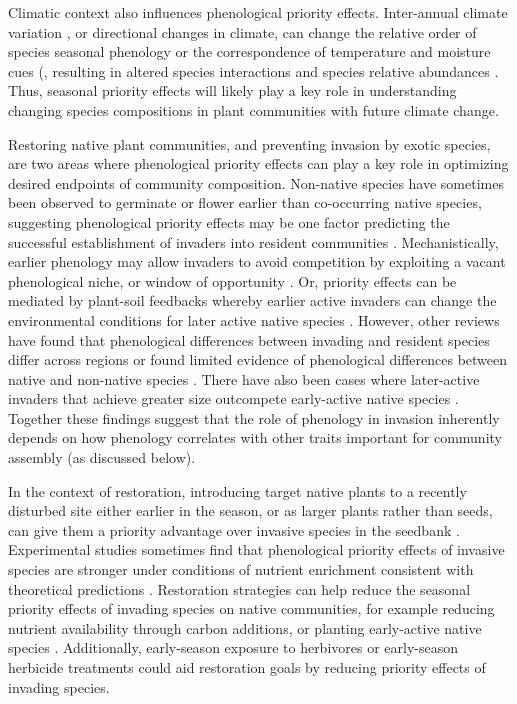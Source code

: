 \documentclass[11pt]{article}
\begin{document}
Climatic context also influences phenological priority effects. Inter-annual climate variation \citep{levine2011seasonal}, or directional changes in climate, can change the relative order of species seasonal phenology or the correspondence of temperature and moisture cues (\cite{kimball2010contemporary}, resulting in altered species interactions and species relative abundances \citep{thomson2017between,kimball2010contemporary,buonaiuto2023contrasting}. Thus, seasonal priority effects will likely play a key role in understanding changing species compositions in plant communities with future climate change.

Restoring native plant communities, and preventing invasion by exotic species, are two areas where phenological priority effects can play a key role in optimizing desired endpoints of community composition. Non-native species have sometimes been observed to germinate \citep{wainwright2012seasonal,wilsey2011biodiversity,marushia2010phenology} or flower \citep{cleland2013strengthening} earlier than co-occurring native species, suggesting phenological priority effects may be one factor predicting the successful establishment of invaders into resident communities \citep{wolkovich2011phenology,alexander2019earlier}. Mechanistically, earlier phenology may allow invaders to avoid competition by exploiting a vacant phenological niche, or window of opportunity \citep{gioria2014resource}. Or, priority effects can be mediated by plant-soil feedbacks whereby earlier active invaders can change the environmental conditions for later active native species \citep{grman2010within}. However, other reviews have found that phenological differences between invading and resident species differ across regions \citep{godoy2009flowering} or found limited evidence of phenological differences between native and non-native species \citep{zettlemoyer2022limited}. There have also been cases where later-active invaders that achieve greater size outcompete early-active native species \citep{godoy2014}. Together these findings suggest that the role of phenology in invasion inherently depends on how phenology correlates with other traits important for community assembly (as discussed below).

In the context of restoration, introducing target native plants to a recently disturbed site either earlier in the season, or as larger plants rather than seeds, can give them a priority advantage over invasive species in the seedbank \citep{young2017using,wilsey2021restoration}. Experimental studies sometimes find that phenological priority effects of invasive species are stronger under conditions of nutrient enrichment \citep{kardol2013resource,valliere2022phenological}  consistent with theoretical predictions \citep{vannette2014historical}.  Restoration strategies can help reduce the seasonal priority effects of invading species on native communities, for example reducing nutrient availability through carbon additions, or planting early-active native species \citep{cleland2013strengthening,hess2019priority}. Additionally, early-season exposure to herbivores \citep{waterton2016trade} or early-season herbicide treatments \citep{marushia2010phenology} could aid restoration goals by reducing priority effects of invading species.
\end{document}
